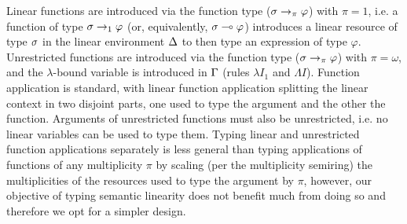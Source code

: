 \documentclass[acmsmall,review,anonymous,screen]{acmart}
\newcommand{\lolli}{\multimap}
\begin{document}
Linear functions are introduced via the function type ($\sigma \to_\pi \varphi$) with
$\pi = 1$, i.e. a function of type $\sigma \to_1 \varphi$ (or, equivalently, $\s \lolli \vp$)
introduces a linear resource of type $\sigma$ in the linear environment $\Delta$ to then type an expression of type $\varphi$.
%
Unrestricted functions are introduced via the function type ($\sigma \to_\pi \varphi$) with $\pi =
\omega$, and the $\lambda$-bound variable is introduced in $\Gamma$ (rules
$\lambda I_1$ and $\Lambda I$). Function application is standard, with
linear function application splitting the linear context in two
disjoint parts, one used to type the argument and the other the
function.
Arguments of unrestricted functions must also be unrestricted, i.e. no
linear variables can be used to type them. 
%
Typing linear and unrestricted function applications separately is less general
than typing applications of functions of any multiplicity $\pi$ by scaling (per the multiplicity
semiring) the multiplicities of the resources used to type the argument by $\pi$, however, our objective of typing semantic
linearity does not benefit much from doing so and therefore we opt for a
simpler design. 
\end{document}

